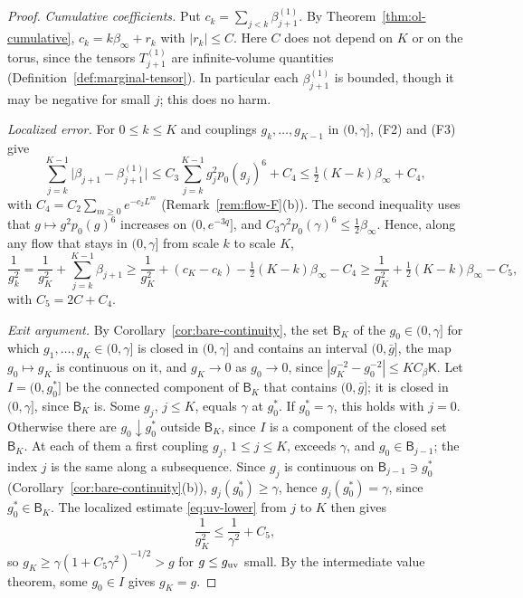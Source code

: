 \begin{proof}
\emph{Cumulative coefficients.} Put $c_k=\sum_{j<k}\beta^{(1)}_{j+1}$. By Theorem~\ref{thm:ol-cumulative}, $c_k=k\beta_\infty+r_k$ with $|r_k|\le C$. Here $C$ does not depend on $K$ or on the torus, since the tensors $T^{(1)}_{j+1}$ are infinite-volume quantities (Definition~\ref{def:marginal-tensor}). In particular each $\beta^{(1)}_{j+1}$ is bounded, though it may be negative for small $j$; this does no harm.

\emph{Localized error.} For $0\le k\le K$ and couplings $g_k,\dots,g_{K-1}$ in $(0,\gamma]$, (F2) and (F3) give
\[
\sum_{j=k}^{K-1}\big|\beta_{j+1}-\beta^{(1)}_{j+1}\big|\le C_3\sum_{j=k}^{K-1}g_j^2p_0(g_j)^6+C_4\le\tfrac12(K-k)\beta_\infty+C_4,
\]
with $C_4=C_2\sum_{m\ge0}e^{-c_2L^m}$ (Remark~\ref{rem:flow-F}(b)). The second inequality uses that $g\mapsto g^2p_0(g)^6$ increases on $(0,e^{-3q}]$, and $C_3\gamma^2p_0(\gamma)^6\le\frac12\beta_\infty$. Hence, along any flow that stays in $(0,\gamma]$ from scale $k$ to scale $K$,
\begin{equation}\label{eq:uv-lower}
\frac1{g_k^2}=\frac1{g_K^2}+\sum_{j=k}^{K-1}\beta_{j+1}\ge\frac1{g_K^2}+(c_K-c_k)-\tfrac12(K-k)\beta_\infty-C_4\ge\frac1{g_K^2}+\tfrac12(K-k)\beta_\infty-C_5,
\end{equation}
with $C_5=2C+C_4$.

\emph{Exit argument.} By Corollary~\ref{cor:bare-continuity}, the set $\mathsf B_K$ of the $g_0\in(0,\gamma]$ for which $g_1,\dots,g_K\in(0,\gamma]$ is closed in $(0,\gamma]$ and contains an interval $(0,\bar g]$, the map $g_0\mapsto g_K$ is continuous on it, and $g_K\to0$ as $g_0\to0$, since $|g_K^{-2}-g_0^{-2}|\le KC_\beta\mathsf K$. Let $I=(0,g_0^*]$ be the connected component of $\mathsf B_K$ that contains $(0,\bar g]$; it is closed in $(0,\gamma]$, since $\mathsf B_K$ is. Some $g_j$, $j\le K$, equals $\gamma$ at $g_0^*$. If $g_0^*=\gamma$, this holds with $j=0$. Otherwise there are $g_0\downarrow g_0^*$ outside $\mathsf B_K$, since $I$ is a component of the closed set $\mathsf B_K$. At each of them a first coupling $g_j$, $1\le j\le K$, exceeds $\gamma$, and $g_0\in\mathsf B_{j-1}$; the index $j$ is the same along a subsequence. Since $g_j$ is continuous on $\mathsf B_{j-1}\ni g_0^*$ (Corollary~\ref{cor:bare-continuity}(b)), $g_j(g_0^*)\ge\gamma$, hence $g_j(g_0^*)=\gamma$, since $g_0^*\in\mathsf B_K$. The localized estimate \eqref{eq:uv-lower} from $j$ to $K$ then gives
\[
\frac1{g_K^2}\le\frac1{\gamma^2}+C_5 ,
\]
so $g_K\ge\gamma(1+C_5\gamma^2)^{-1/2}>g$ for $g\le g_{\rm uv}$ small. By the intermediate value theorem, some $g_0\in I$ gives $g_K=g$.


\end{proof}
